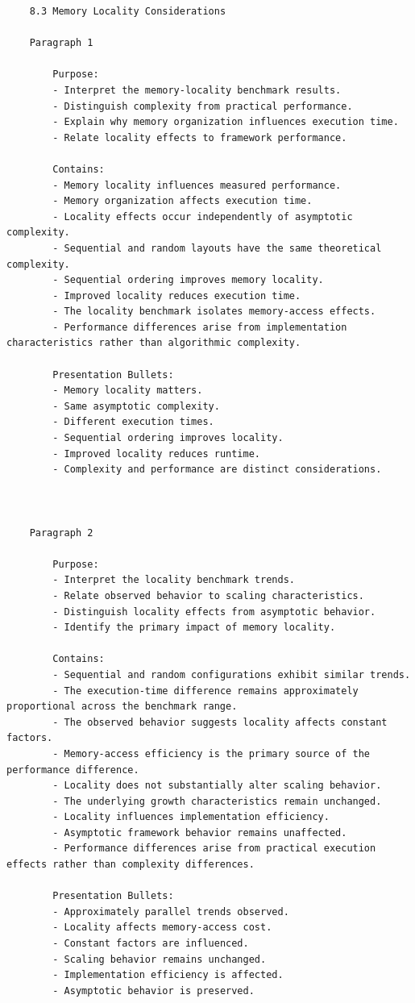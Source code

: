 \begin{verbatim}
	8.3 Memory Locality Considerations

	Paragraph 1

		Purpose:
		- Interpret the memory-locality benchmark results.
		- Distinguish complexity from practical performance.
		- Explain why memory organization influences execution time.
		- Relate locality effects to framework performance.

		Contains:
		- Memory locality influences measured performance.
		- Memory organization affects execution time.
		- Locality effects occur independently of asymptotic complexity.
		- Sequential and random layouts have the same theoretical complexity.
		- Sequential ordering improves memory locality.
		- Improved locality reduces execution time.
		- The locality benchmark isolates memory-access effects.
		- Performance differences arise from implementation characteristics rather than algorithmic complexity.

		Presentation Bullets:
		- Memory locality matters.
		- Same asymptotic complexity.
		- Different execution times.
		- Sequential ordering improves locality.
		- Improved locality reduces runtime.
		- Complexity and performance are distinct considerations.



	Paragraph 2

		Purpose:
		- Interpret the locality benchmark trends.
		- Relate observed behavior to scaling characteristics.
		- Distinguish locality effects from asymptotic behavior.
		- Identify the primary impact of memory locality.

		Contains:
		- Sequential and random configurations exhibit similar trends.
		- The execution-time difference remains approximately proportional across the benchmark range.
		- The observed behavior suggests locality affects constant factors.
		- Memory-access efficiency is the primary source of the performance difference.
		- Locality does not substantially alter scaling behavior.
		- The underlying growth characteristics remain unchanged.
		- Locality influences implementation efficiency.
		- Asymptotic framework behavior remains unaffected.
		- Performance differences arise from practical execution effects rather than complexity differences.

		Presentation Bullets:
		- Approximately parallel trends observed.
		- Locality affects memory-access cost.
		- Constant factors are influenced.
		- Scaling behavior remains unchanged.
		- Implementation efficiency is affected.
		- Asymptotic behavior is preserved.



\end{verbatim}
